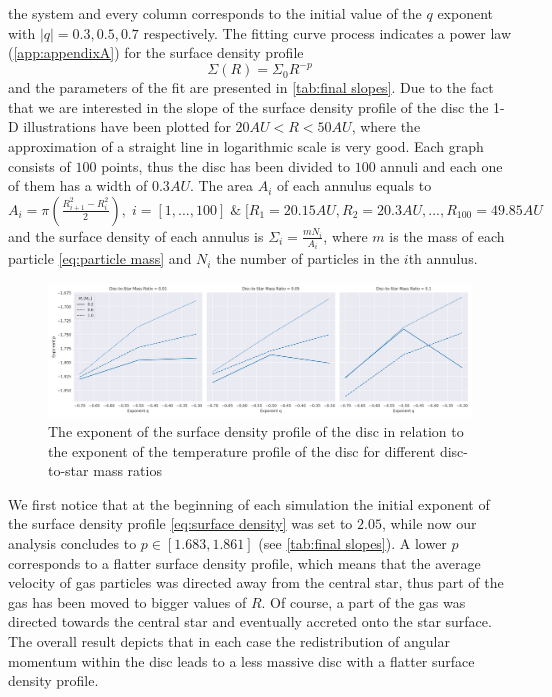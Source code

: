 \documentclass[aps,prb,twocolumn,superscriptaddress,floatfix,longbibliography]{revtex4-2}
\newcounter{para}
\begin{document}
the system and every column corresponds to the initial value of the $q$ exponent with $|q|=0.3, 0.5, 0.7$ respectively.
The fitting curve process indicates a power law (\cref{app:appendixA}) for the surface density profile
\begin{equation}
    \Sigma(R) = \Sigma_0 R^{-p}
\end{equation}\label{eq:final surface density profile} and the parameters of the fit are presented in \cref{tab:final slopes}.
Due to the fact that we are interested in the slope of the surface density profile of the disc the 1-D illustrations have been plotted for $20 AU< R < 50AU$, where the approximation of a straight line in logarithmic scale is very good. Each graph consists of $100$ points, thus the disc has been divided to $100$ annuli and each one of them has a width of $0.3 AU$. The area $A_i$ of each annulus equals to $A_i = \pi (\frac{R_{i+1}^2-R_{i}^2}{2}),\; i=[1,...,100] \; \& \; [R_1=20.15AU, R_2=20.3AU,...,R_{100}=49.85AU$ and the surface density of each annulus is $\Sigma_i = \frac{mN_i}{A_i}$, where $m$ is the mass of each particle \eqref{eq:particle mass} and $N_i$ the number of particles in the $i$th annulus.\\


\begingroup
\onecolumngrid
\begingroup
\begin{figure}[!htbp]
    \centering
    \includegraphics[width=\linewidth]{Figures/figure2.png}
    \caption{The exponent of the surface density profile of the disc in relation to the exponent of the temperature profile of the disc for different disc-to-star mass ratios}\label{fig:p vs q for different w}
\end{figure}
\endgroup
\endgroup


\twocolumngrid
We first notice that at the beginning of each simulation the initial exponent of the surface density profile \eqref{eq:surface density} was set to $2.05$, while now our analysis concludes to $p \in [1.683, 1.861]$ (see \cref{tab:final slopes}). A lower $p$ corresponds to a flatter surface density profile, which means that the average velocity of gas particles was directed away from the central star, thus part of the gas has been moved to bigger values of $R$. Of course, a part of the gas was directed towards the central star and eventually accreted onto the star surface. The overall result depicts that in each case the redistribution of angular momentum within the disc leads to a less massive disc with a flatter surface density profile.
\end{document}

